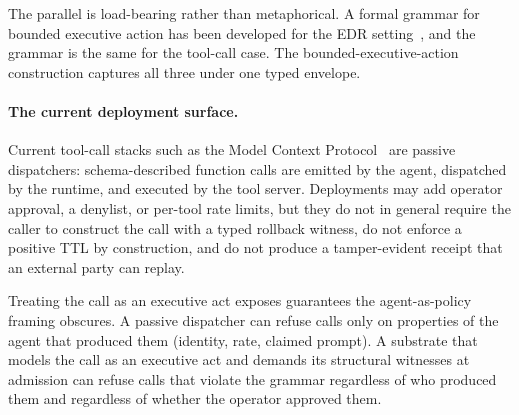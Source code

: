 The parallel is load-bearing rather than metaphorical. A formal grammar for bounded executive action has been developed for the EDR setting~\cite{programmableSovereignty2026}, and the grammar is the same for the tool-call case. The bounded-executive-action construction captures all three under one typed envelope.

\paragraph{The current deployment surface.}
Current tool-call stacks such as the Model Context Protocol~\cite{anthropicMCP2024} are passive dispatchers: schema-described function calls are emitted by the agent, dispatched by the runtime, and executed by the tool server. Deployments may add operator approval, a denylist, or per-tool rate limits, but they do not in general require the caller to construct the call with a typed rollback witness, do not enforce a positive TTL by construction, and do not produce a tamper-evident receipt that an external party can replay.

Treating the call as an executive act exposes guarantees the agent-as-policy framing obscures. A passive dispatcher can refuse calls only on properties of the agent that produced them (identity, rate, claimed prompt). A substrate that models the call as an executive act and demands its structural witnesses at admission can refuse calls that violate the grammar regardless of who produced them and regardless of whether the operator approved them.
